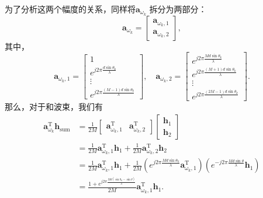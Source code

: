 为了分析这两个幅度的关系，同样将\( \bm{a}_{\omega_k} \) 拆分为两部分：
\[
    \bm{a}_{\omega_k} =
    \begin{bmatrix}
        \bm{a}_{\omega_k,1} \\
        \bm{a}_{\omega_k,2}
    \end{bmatrix},
\]
其中，
\[
    \bm{a}_{\omega_k,1} = \begin{bmatrix}
        1                                           \\
        e^{j 2 \pi \frac{d \sin \theta_k}{\lambda}} \\
        \vdots                                      \\
        e^{j 2 \pi \frac{(M-1) d \sin \theta_k}{\lambda}}
    \end{bmatrix}, \quad
    \bm{a}_{\omega_k,2} = \begin{bmatrix}
        e^{j 2 \pi \frac{M d \sin \theta_k}{\lambda}}     \\
        e^{j 2 \pi \frac{(M+1) d \sin \theta_k}{\lambda}} \\
        \vdots                                            \\
        e^{j 2 \pi \frac{(2M-1) d \sin \theta_k}{\lambda}}
    \end{bmatrix}.
\]
那么，对于和波束，我们有
\[
    \begin{split}
        \bm{a}_{\omega_k}^{\mathrm{T}} \bm{h}_{\text{sum}} & = \frac{1}{2M}\begin{bmatrix}
                                                                               \bm{a}_{\omega_k,1}^{\mathrm{T}} & \bm{a}_{\omega_k,2}^{\mathrm{T}}
                                                                           \end{bmatrix}
        \begin{bmatrix}
            \bm{h}_1 \\
            \bm{h}_2
        \end{bmatrix}                                                                                                                                                                                                                                                                                  \\
                                                           & = \frac{1}{2M} \bm{a}_{\omega_k,1}^{\mathrm{T}} \bm{h}_1 + \frac{1}{2M} \bm{a}_{\omega_k,2}^{\mathrm{T}} \bm{h}_2                                                                                                                          \\
                                                           & = \frac{1}{2M} \bm{a}_{\omega_k,1}^{\mathrm{T}} \bm{h}_1 + \frac{1}{2M} \left( e^{j 2 \pi \frac{M d \sin \theta_k}{\lambda}} \bm{a}_{\omega_k,1}^{\mathrm{T}} \right) \left( e^{-j 2 \pi \frac{M d \sin \theta}{\lambda}} \bm{h}_1 \right) \\
                                                           & = \frac{1 + e^{j 2\pi \frac{M d (\sin \theta_k - \sin \theta)}{\lambda}}}{2M} \bm{a}_{\omega_k,1}^{\mathrm{T}} \bm{h}_1.
    \end{split}
\]
